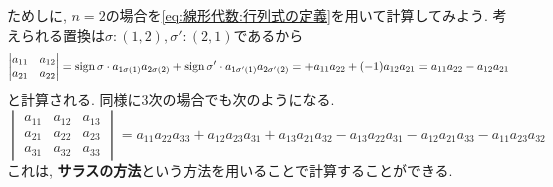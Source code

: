         ためしに, $n=2$の場合を\eqref{eq:線形代数:行列式の定義}を用いて計算してみよう. 考えられる置換は$\sigma:(1,2),\sigma':(2,1)$であるから
        \begin{equation*}
            \begin{vmatrix}
                a_{11} & a_{12} \\ a_{21} & a_{22}
            \end{vmatrix} = \mathop{\mathrm{sign}}\nolimits\sigma \cdot a_{1\sigma(1)}a_{2\sigma(2)}+\mathop{\mathrm{sign}}\nolimits\sigma'\cdot a_{1\sigma'(1)}a_{2\sigma'(2)}=+a_{11}a_{22}+(-1)a_{12}a_{21}=a_{11}a_{22}-a_{12}a_{21}
        \end{equation*}
        と計算される.
        \clearpage
        同様に3次の場合でも次のようになる.
        \begin{equation*}
            \begin{vmatrix}
                a_{11} & a_{12} & a_{13} \\ 
                a_{21} & a_{22} & a_{23} \\ 
                a_{31} & a_{32} & a_{33}
            \end{vmatrix}
            =
            a_{11} a_{22} a_{33} + a_{12} a_{23} a_{31} + a_{13} a_{21} a_{32} 
            - a_{13} a_{22} a_{31} - a_{12} a_{21} a_{33} - a_{11} a_{23} a_{32}                
        \end{equation*}
        これは, \textbf{サラスの方法}という方法を用いることで計算することができる.
